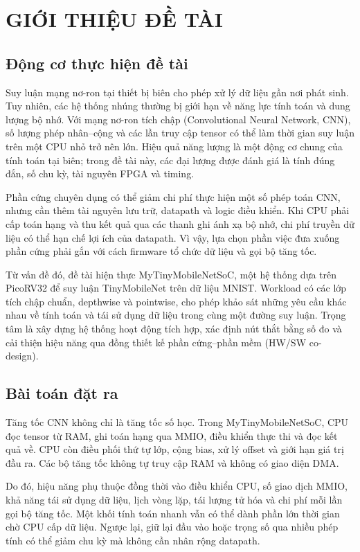 \chapter{GIỚI THIỆU ĐỀ TÀI}
\label{chap:gioithieu}

\section{Động cơ thực hiện đề tài}
Suy luận mạng nơ-ron tại thiết bị biên cho phép xử lý dữ liệu gần nơi phát sinh. Tuy nhiên, các hệ thống nhúng thường bị giới hạn về năng lực tính toán và dung lượng bộ nhớ. Với mạng nơ-ron tích chập (Convolutional Neural Network, CNN), số lượng phép nhân--cộng và các lần truy cập tensor có thể làm thời gian suy luận trên một CPU nhỏ trở nên lớn. Hiệu quả năng lượng là một động cơ chung của tính toán tại biên; trong đề tài này, các đại lượng được đánh giá là tính đúng đắn, số chu kỳ, tài nguyên FPGA và timing.

Phần cứng chuyên dụng có thể giảm chi phí thực hiện một số phép toán CNN, nhưng cần thêm tài nguyên lưu trữ, datapath và logic điều khiển. Khi CPU phải cấp toán hạng và thu kết quả qua các thanh ghi ánh xạ bộ nhớ, chi phí truyền dữ liệu có thể hạn chế lợi ích của datapath. Vì vậy, lựa chọn phần việc đưa xuống phần cứng phải gắn với cách firmware tổ chức dữ liệu và gọi bộ tăng tốc.

Từ vấn đề đó, đề tài hiện thực MyTinyMobileNetSoC, một hệ thống dựa trên PicoRV32 để suy luận TinyMobileNet trên dữ liệu MNIST. Workload có các lớp tích chập chuẩn, depthwise và pointwise, cho phép khảo sát những yêu cầu khác nhau về tính toán và tái sử dụng dữ liệu trong cùng một đường suy luận. Trọng tâm là xây dựng hệ thống hoạt động tích hợp, xác định nút thắt bằng số đo và cải thiện hiệu năng qua đồng thiết kế phần cứng--phần mềm (HW/SW co-design).

\section{Bài toán đặt ra}
Tăng tốc CNN không chỉ là tăng tốc số học. Trong MyTinyMobileNetSoC, CPU đọc tensor từ RAM, ghi toán hạng qua MMIO, điều khiển thực thi và đọc kết quả về. CPU còn điều phối thứ tự lớp, cộng bias, xử lý offset và giới hạn giá trị đầu ra. Các bộ tăng tốc không tự truy cập RAM và không có giao diện DMA.

Do đó, hiệu năng phụ thuộc đồng thời vào điều khiển CPU, số giao dịch MMIO, khả năng tái sử dụng dữ liệu, lịch vòng lặp, tái lượng tử hóa và chi phí mỗi lần gọi bộ tăng tốc. Một khối tính toán nhanh vẫn có thể dành phần lớn thời gian chờ CPU cấp dữ liệu. Ngược lại, giữ lại đầu vào hoặc trọng số qua nhiều phép tính có thể giảm chu kỳ mà không cần nhân rộng datapath.


